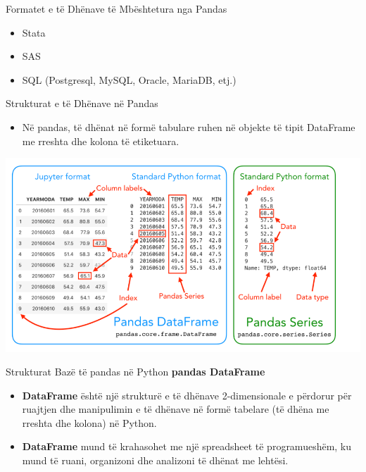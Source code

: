 \documentclass[
  ignorenonframetext,
]{beamer}
\providecommand{\tightlist}{%
  \setlength{\itemsep}{0pt}\setlength{\parskip}{0pt}}
\begin{document}
\begin{frame}{Formatet e të Dhënave të Mbështetura nga Pandas}
\protect\hypertarget{formatet-e-tuxeb-dhuxebnave-tuxeb-mbuxebshtetura-nga-pandas-1}{}
\begin{itemize}
\item
  Stata
\item
  SAS
\item
  SQL (Postgresql, MySQL, Oracle, MariaDB, etj.)
\end{itemize}
\end{frame}

\begin{frame}{Strukturat e të Dhënave në Pandas}
\protect\hypertarget{strukturat-e-tuxeb-dhuxebnave-nuxeb-pandas}{}
\begin{itemize}
\tightlist
\item
  Në pandas, të dhënat në formë tabulare ruhen në objekte të tipit
  DataFrame me rreshta dhe kolona të etiketuara.
\end{itemize}

\includegraphics{./Figs/panda2.png}
\end{frame}

\begin{frame}{Strukturat Bazë të pandas në Python}
\protect\hypertarget{strukturat-bazuxeb-tuxeb-pandas-nuxeb-python}{}
\textbf{pandas DataFrame}

\begin{itemize}
\item
  \textbf{DataFrame} është një strukturë e të dhënave 2-dimensionale e
  përdorur për ruajtjen dhe manipulimin e të dhënave në formë tabelare
  (të dhëna me rreshta dhe kolona) në Python.
\item
  \textbf{DataFrame} mund të krahasohet me një spreadsheet të
  programueshëm, ku mund të ruani, organizoni dhe analizoni të dhënat me
  lehtësi.
\end{itemize}
\end{frame}
\end{document}
